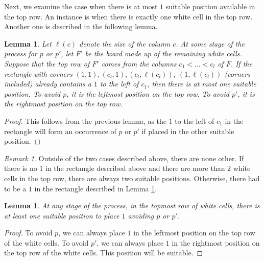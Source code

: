 \documentclass[12pt, english, a4paper]{article}
\theoremstyle{plain}
\newtheorem{lemma}[theorem]{Lemma}
\theoremstyle{definition}
\theoremstyle{remark}
\newtheorem{remark}[theorem]{Remark}
\begin{document}
Next, we examine the case when there is at most $1$ suitable position available in the top row. An instance is when there is exactly one white cell in the top row. Another one is described in the following lemma. 
\begin{lemma}\label{lem: rect}
    Let $\ell(c)$ denote the size of the column $c$. At some stage of the process for $p$ or $p'$, let $F'$ be the board made up of the remaining white cells. Suppose that the top row of $F'$ comes from the columns $c_1<\dots<c_l$ of $F$. If the rectangle with corners $(1,1), (c_l,1), (c_l, \ell(c_l))$, $(1,\ell(c_l))$ (corners included) already contains a $1$ to the left of $c_1$, then there is at most one suitable position. To avoid $p$, it is the leftmost position on the top row. To avoid $p'$, it is the rightmost position on the top row.
\end{lemma}
\begin{proof}
    This follows from the previous lemma, as the $1$ to the left of $c_1$ in the rectangle will form an occurrence of $p$ or $p'$ if placed in the other suitable position.
\end{proof}
\begin{remark}
    Outside of the two cases described above, there are none other. If there is no $1$ in the rectangle described above and there are more than $2$ white cells in the top row, there are always two suitable positions. Otherwise, there had to be a $1$ in the rectangle described in Lemma \ref{lem: rect}.
\end{remark}
\begin{lemma}\label{lem: atleast1}
    At any stage of the process, in the topmost row of white cells, there is at least one suitable position to place $1$ avoiding $p$ or $p'$.
\end{lemma}
\begin{proof}
    To avoid $p$, we can always place $1$ in the leftmost position on the top row of the white cells. To avoid $p'$, we can always place $1$ in the rightmost position on the top row of the white cells. This position will be suitable.
\end{proof}
\end{document}
